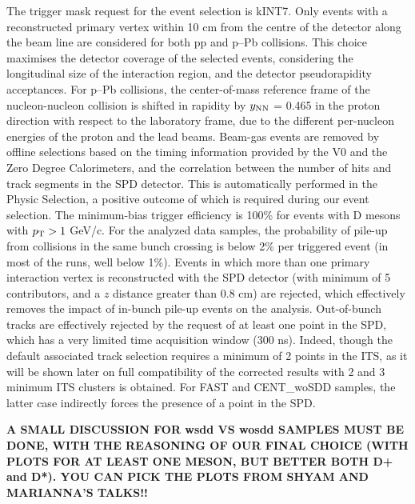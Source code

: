 The trigger mask request for the event selection is kINT7. Only events with a reconstructed primary vertex within 10 cm from the centre of the detector along the beam line are considered for both pp and p–Pb collisions. This choice maximises the detector coverage of the selected events, considering the longitudinal size of the interaction region, and
the detector pseudorapidity acceptances. For p–Pb collisions, the center-of-mass reference frame of the nucleon-nucleon collision is shifted in rapidity by $y_{\rm NN}$ = 0.465 in the proton direction with respect to the laboratory frame, due to the different per-nucleon energies of the proton and the lead beams.
Beam-gas events are removed by offline selections based on the timing information provided by the V0 and the Zero Degree Calorimeters, and the correlation between the number of hits and track segments in the SPD detector. This is automatically performed in the Physic Selection, a positive outcome of which is required during our event selection.
The minimum-bias trigger efficiency is 100\% for events with D mesons with $p_{\rm T} > 1$ GeV/c. For the analyzed data samples, the probability of
pile-up from collisions in the same bunch crossing is below 2\% per triggered event (in most of the runs, well below 1\%). Events in which more than one primary interaction vertex is reconstructed with the SPD detector (with minimum of 5 contributors, and a $z$ distance greater than 0.8 cm) are
rejected, which effectively removes the impact of in-bunch pile-up events on the analysis. Out-of-bunch tracks are effectively rejected by the request of at least one point in the SPD, which has a very limited time acquisition window (300 ns). Indeed, though the default associated track selection requires a minimum of 2 points in the ITS, as it will be shown later on full compatibility of the corrected results with 2 and 3 minimum ITS clusters is obtained. For FAST and CENT_woSDD samples, the latter case indirectly forces the presence of a point in the SPD. 

{\bf A SMALL DISCUSSION FOR wsdd VS wosdd SAMPLES MUST BE DONE, WITH THE REASONING OF OUR FINAL CHOICE (WITH PLOTS FOR AT LEAST ONE MESON, BUT BETTER BOTH D+ and D*). YOU CAN PICK THE PLOTS FROM SHYAM AND MARIANNA'S TALKS!!} 